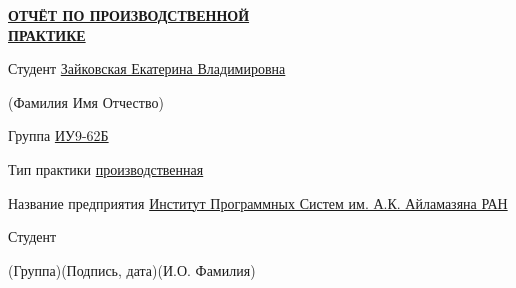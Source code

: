 \documentclass[14pt, russian]{scrartcl}
\begin{document}
\sloppy

\def\figurename{Рисунок}

\begin{titlepage}
\thispagestyle{empty}
\newpage

\bmstuheader
 
 
\begin{center}
\Large {\textbf{\uline{ОТЧЁТ ПО ПРОИЗВОДСТВЕННОЙ}}} \\ {\textbf{\uline{ПРАКТИКЕ}}}
\end{center}\normalsize

\vspace{2ex}
\noindent Студент \underline{\hspace{40pt} Зайковская Екатерина Владимировна \hspace{130pt}}

\vspace{-1.1ex}
\noindent\hspace{31ex}\scriptsize{(Фамилия Имя Отчество)}\normalsize

\vspace{0.7ex}
\noindent Группа \underline{\hspace{20pt} ИУ9-62Б \hspace{20pt}}
 
\vspace{2ex}
\noindent Тип практики \underline{ \hspace{20pt} производственная \hspace{230pt} }

\vspace{2.5ex}
\noindent Название предприятия \underline{\hspace{16pt}\footnotesize Институт Программных Систем им. А.К. Айламазяна РАН\hspace{12pt}}\normalsize

\vspace{\fill}
 

\noindent Студент \underline{\hspace{1.5cm}} \hfill \underline{\hspace{4cm}}\quad
\underline{\hspace{4cm}}

\vspace{-2.1ex}
\noindent\hspace{9ex}\scriptsize{(Группа)}\normalsize\hspace{170pt}\hspace{2ex}\scriptsize{(Подпись, дата)}\normalsize\hspace{30pt}\hspace{6ex}\scriptsize{(И.О. Фамилия)}\normalsize


\end{titlepage}
\end{document}
